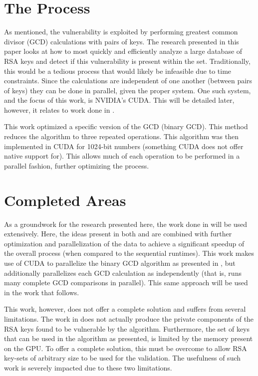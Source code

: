 \documentclass[12pt]{ucthesis}
\begin{document}
\section{The Process}
As mentioned, the vulnerability is exploited by performing greatest common
divisor (GCD) calculations with pairs of keys. The research presented in this
paper looks at how to most quickly and efficiently analyze a large database of
RSA keys and detect if this vulnerability is present within the set.
Traditionally, this would be a tedious process that would likely be infeasible
due to time constraints. Since the calculations are independent of one another
(between pairs of keys) they can be done in parallel, given the proper system.
One such system, and the focus of this work, is NVIDIA's CUDA. This will be
detailed later, however, it relates to work done in \cite{fujimoto2009high}. 

This work optimized a specific version of the GCD (binary GCD). This method
reduces the algorithm to three repeated operations. This algorithm was then
implemented in CUDA for 1024-bit numbers (something CUDA does not offer native
support for). This allows much of each operation to be performed in a parallel
fashion, further optimizing the process.

\section{Completed Areas}
As a groundwork for the research presented here, the work done in
\cite{scharfglass2012CUDA} will be used extensively. Here, the ideas present in
both \cite{lenstra2012ron} and \cite{fujimoto2009high} are combined with
further optimization and parallelization of the data to achieve a significant
speedup of the overall process (when compared to the sequential runtimes). This
work makes use of CUDA to parallelize the binary GCD algorithm as presented in
\cite{fujimoto2009high}, but additionally parallelizes each GCD calculation as
independently (that is, runs many complete GCD comparisons in parallel). This
same approach will be used in the work that follows.

This work, however, does not offer a complete solution and suffers from several
limitations. The work in \cite{scharfglass2012CUDA} does not actually produce
the private components of the RSA keys found to be vulnerable by the algorithm.
Furthermore, the set of keys that can be used in the algorithm as presented, is
limited by the memory present on the GPU. To offer a complete solution, this
must be overcome to allow RSA key-sets of arbitrary size to be used for the
validation. The usefulness of such work is severely impacted due to these two
limitations.
\end{document}

